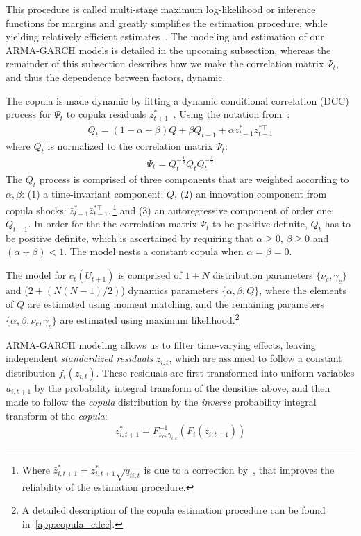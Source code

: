 This procedure is called multi-stage maximum log-likelihood or inference functions for margins and greatly simplifies the estimation procedure, while yielding relatively efficient estimates~\autocite{Patton2006,Joe1997}. The modeling and estimation of our ARMA-GARCH models is detailed in the upcoming subsection, whereas the remainder of this subsection describes how we make the correlation matrix $\Psi_t$, and thus the dependence between factors, dynamic.

The copula is made dynamic by fitting a dynamic conditional correlation (DCC) process for $\Psi_t$ to copula residuals $z_{t+1}^*$~\autocite{Engle2002}. Using the notation from~\textcite{ChristoffersenLanglois2013}:
\begin{align}
  Q_t = (1 - \alpha - \beta) Q
    + \beta Q_{t-1}
    + \alpha \bar{z}_{t-1}^* \bar{z}_{t-1}^{*\top}
  \label{eq:copula_cdcc}
\end{align}
where $Q_t$ is normalized to the correlation matrix $\Psi_t$:
\begin{align}
  \Psi_t = Q_t^{-\frac{1}{2}} Q_t Q_t^{-\frac{1}{2}}
  \label{eq:copula_cdcc_psi}
\end{align}
The $Q_t$ process is comprised of three components that are weighted according to $\alpha, \beta$: (1) a time-invariant component: $Q$, (2) an innovation component from copula shocks: $\bar{z}_{t-1}^{*} \bar{z}_{t-1}^{*\top},$\footnote{Where $\bar{z}_{i,t+1}^* = z_{i,t+1}^* \sqrt{q_{ii,t}}$ is due to a correction by~\textcite{Aielli2013}, that improves the reliability of the estimation procedure.} and (3) an autoregressive component of order one: $Q_{t-1}$. In order for the the correlation matrix $\Psi_t$ to be positive definite, $Q_t$ has to be positive definite, which is ascertained by requiring that $\alpha \geq 0$, $\beta \geq 0$ and $(\alpha + \beta) < 1$. The model nests a constant copula when $\alpha = \beta = 0$.

The model for $c_t(U_{t+1})$ is comprised of $1 + N$ distribution parameters $\{\nu_c, \gamma_c\}$ and (${2 + (N(N-1) / 2)}$) dynamics parameters $\{\alpha, \beta, Q\}$, where the elements of $Q$ are estimated using moment matching, and the remaining parameters $\{\alpha, \beta, \nu_c, \gamma_c\}$ are estimated using maximum likelihood.\footnote{A detailed description of the copula estimation procedure can be found in~\autoref{app:copula_cdcc}.}

ARMA-GARCH modeling allows us to filter time-varying effects, leaving independent \emph{standardized residuals} $z_{i,t}$, which are assumed to follow a constant distribution $f_i(z_{i,t})$. These residuals are first transformed into uniform variables $u_{i,t+1}$ by the probability integral transform of the densities above, and then made to follow the \emph{copula} distribution by the \emph{inverse} probability integral transform of the \emph{copula}:
\begin{align}
  z_{i,t+1}^* = F^{-1}_{\nu_c,\gamma_{i,c}}(F_{i}(z_{i,t+1}))
\end{align}

